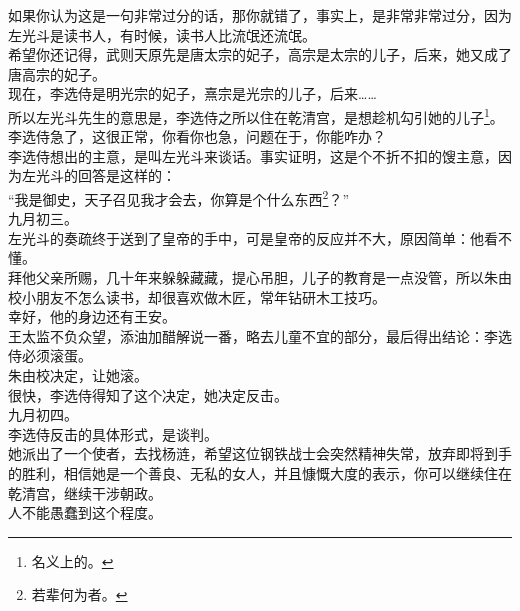 \begin{multicols}{\theparacolNo}
如果你认为这是一句非常过分的话，那你就错了，事实上，是非常非常过分，因为左光斗是读书人，有时候，读书人比流氓还流氓。\\

希望你还记得，武则天原先是唐太宗的妃子，高宗是太宗的儿子，后来，她又成了唐高宗的妃子。\\

现在，李选侍是明光宗的妃子，熹宗是光宗的儿子，后来……\\

所以左光斗先生的意思是，李选侍之所以住在乾清宫，是想趁机勾引她的儿子\footnote{名义上的。}。\\

李选侍急了，这很正常，你看你也急，问题在于，你能咋办？\\

李选侍想出的主意，是叫左光斗来谈话。事实证明，这是个不折不扣的馊主意，因为左光斗的回答是这样的：\\

“我是御史，天子召见我才会去，你算是个什么东西\footnote{若辈何为者。}？”\\

九月初三。\\

左光斗的奏疏终于送到了皇帝的手中，可是皇帝的反应并不大，原因简单：他看不懂。\\

拜他父亲所赐，几十年来躲躲藏藏，提心吊胆，儿子的教育是一点没管，所以朱由校小朋友不怎么读书，却很喜欢做木匠，常年钻研木工技巧。\\

幸好，他的身边还有王安。\\

王太监不负众望，添油加醋解说一番，略去儿童不宜的部分，最后得出结论：李选侍必须滚蛋。\\

朱由校决定，让她滚。\\

很快，李选侍得知了这个决定，她决定反击。\\

九月初四。\\

李选侍反击的具体形式，是谈判。\\

她派出了一个使者，去找杨涟，希望这位钢铁战士会突然精神失常，放弃即将到手的胜利，相信她是一个善良、无私的女人，并且慷慨大度的表示，你可以继续住在乾清宫，继续干涉朝政。\\

人不能愚蠢到这个程度。\\


\end{multicols}
